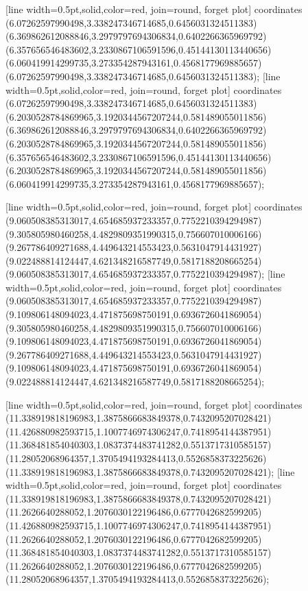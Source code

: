 [line width=0.5pt,solid,color=red, join=round, forget plot] coordinates {(6.07262597990498,3.338247346714685,0.6456031324511383) (6.369862612088846,3.2979797694306834,0.6402266365969792) (6.357656546483602,3.2330867106591596,0.45144130113440656) (6.060419914299735,3.273354287943161,0.4568177969885657) (6.07262597990498,3.338247346714685,0.6456031324511383)};
[line width=0.5pt,solid,color=red, join=round, forget plot] coordinates {(6.07262597990498,3.338247346714685,0.6456031324511383) (6.2030528784869965,3.1920344567207244,0.581489055011856) (6.369862612088846,3.2979797694306834,0.6402266365969792) (6.2030528784869965,3.1920344567207244,0.581489055011856) (6.357656546483602,3.2330867106591596,0.45144130113440656) (6.2030528784869965,3.1920344567207244,0.581489055011856) (6.060419914299735,3.273354287943161,0.4568177969885657)};

[line width=0.5pt,solid,color=red, join=round, forget plot] coordinates {(9.060508385313017,4.654685937233357,0.7752210394294987) (9.305805980460258,4.4829809351990315,0.756607010006166) (9.267786409271688,4.449643214553423,0.5631047914431927) (9.022488814124447,4.621348216587749,0.5817188208665254) (9.060508385313017,4.654685937233357,0.7752210394294987)};
[line width=0.5pt,solid,color=red, join=round, forget plot] coordinates {(9.060508385313017,4.654685937233357,0.7752210394294987) (9.109806148094023,4.471875698750191,0.6936726041869054) (9.305805980460258,4.4829809351990315,0.756607010006166) (9.109806148094023,4.471875698750191,0.6936726041869054) (9.267786409271688,4.449643214553423,0.5631047914431927) (9.109806148094023,4.471875698750191,0.6936726041869054) (9.022488814124447,4.621348216587749,0.5817188208665254)};

[line width=0.5pt,solid,color=red, join=round, forget plot] coordinates {(11.338919818196983,1.3875866683849378,0.7432095207028421) (11.426880982593715,1.1007746974306247,0.7418954144387951) (11.368481854040303,1.0837374483741282,0.5513717310585157) (11.28052068964357,1.3705494193284413,0.5526858373225626) (11.338919818196983,1.3875866683849378,0.7432095207028421)};
[line width=0.5pt,solid,color=red, join=round, forget plot] coordinates {(11.338919818196983,1.3875866683849378,0.7432095207028421) (11.2626640288052,1.2076030122196486,0.6777042682599205) (11.426880982593715,1.1007746974306247,0.7418954144387951) (11.2626640288052,1.2076030122196486,0.6777042682599205) (11.368481854040303,1.0837374483741282,0.5513717310585157) (11.2626640288052,1.2076030122196486,0.6777042682599205) (11.28052068964357,1.3705494193284413,0.5526858373225626)};

